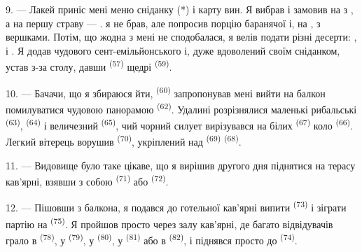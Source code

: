 
\VUsaut{4.0mm}
\VUsaut{3.0mm}

9. --- Лакей приніс мені меню сніданку (*) і карту вин. Я вибрав і замовив на
  з , а на першу страву ---
.  я не брав, але попросив порцію
баранячої  і, на ,  з вершками.
Потім, що жодна з  мені не сподобалася, я велів подати
різні десерти: ,  і . Я додав
чудового сент-емільйонського  і, дуже вдоволений своїм сніданком,
устав з-за столу, давши  \textsuperscript{(57)} щедрі
 \textsuperscript{(59)}.

10. --- Бачачи, що я збираюся йти,  \textsuperscript{(60)}
запропонував мені вийти на балкон помилуватися чудовою панорамою
 \textsuperscript{(62)}. Удалині розрізнялися маленькі рибальські
 \textsuperscript{(63)},  \textsuperscript{(64)}
і величезний  \textsuperscript{(65)}, чий чорний силует
вирізувався на білих  \textsuperscript{(67)} коло 
\textsuperscript{(66)}. Легкий вітерець ворушив 
\textsuperscript{(70)}, укріплений над  \textsuperscript{(69)}
 \textsuperscript{(68)}.

\VUsaut{3.0mm}
\VUsaut{3.0mm}

11. --- Видовище було таке цікаве, що я вирішив другого дня піднятися на терасу
кав'ярні, взявши з собою  \textsuperscript{(71)} або
 \textsuperscript{(72)}.

12. --- Пішовши з балкона, я подався до готельної кав'ярні випити
 \textsuperscript{(73)} і зіграти партію на 
\textsuperscript{(75)}. Я пройшов просто через залу кав'ярні, де багато
відвідувачів грало в  \textsuperscript{(78)}, у 
\textsuperscript{(79)}, у  \textsuperscript{(80)}, у
 \textsuperscript{(81)} або в 
\textsuperscript{(82)}, і піднявся просто до 
\textsuperscript{(74)}.

